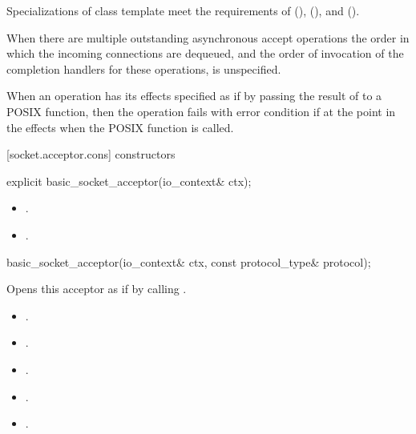 \pnum
Specializations of class template  meet the requirements of  (),  (), and  ().

\pnum
 When there are multiple outstanding asynchronous accept operations the order in which the incoming connections are dequeued, and the order of invocation of the completion handlers for these operations, is unspecified.

\pnum
When an operation has its effects specified as if by passing the result of  to a POSIX function, then the operation fails with error condition  if  at the point in the effects when the POSIX function is called.


[socket.acceptor.cons]{ constructors}

\begin{itemdecl}
explicit basic_socket_acceptor(io_context& ctx);
\end{itemdecl}

\begin{itemdescr}
\pnum
\postconditions
\begin{itemize}
\item
{}.
\item
{}.
\end{itemize}
\end{itemdescr}

\begin{itemdecl}
basic_socket_acceptor(io_context& ctx, const protocol_type& protocol);
\end{itemdecl}

\begin{itemdescr}
\pnum
\effects Opens this acceptor as if by calling .

\pnum
\postconditions
\begin{itemize}
\item
{}.
\item
{}.
\item
{}.
\item
{}.
\item
{}.
\end{itemize}
\end{itemdescr}

